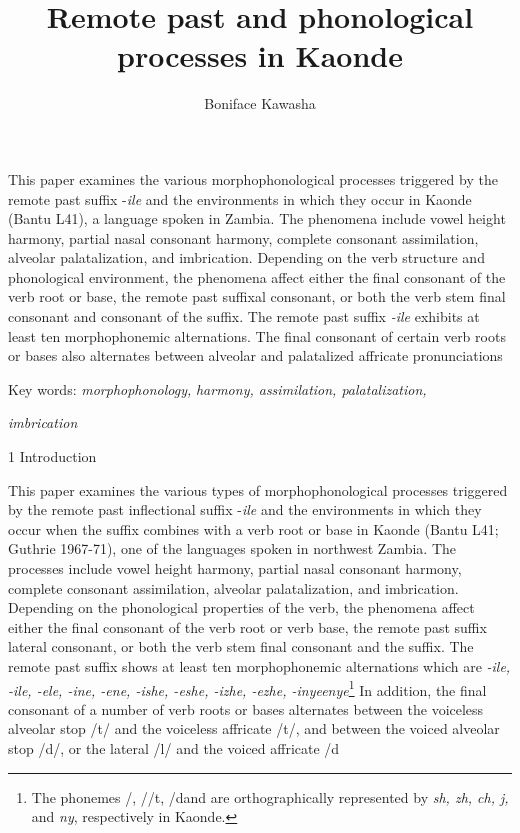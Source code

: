 \documentclass[output=paper]{langsci/langscibook}
\title{Remote past and phonological processes in Kaonde}
\author{%
Boniface Kawasha\affiliation{Savannah State University}
}
\begin{document}
\begin{stylelsAbstract}
This paper examines the various morphophonological processes triggered by the remote past suffix -\emph{ile} and the environments in which they occur in Kaonde (Bantu L41), a language spoken in Zambia. The phenomena include vowel height harmony, partial nasal consonant harmony, complete consonant assimilation, alveolar palatalization, and imbrication. Depending on the verb structure and phonological environment, the phenomena affect either the final consonant of the verb root or base, the remote past suffixal consonant, or both the verb stem final consonant and consonant of the suffix. The remote past suffix \emph{{}-ile} exhibits at least ten morphophonemic alternations. The final consonant of certain verb roots or bases also alternates between alveolar and palatalized affricate pronunciations 
\end{stylelsAbstract}

Key words: \textit{morphophonology,} \emph{harmony, assimilation, palatalization, }

\emph{                   imbrication}

\begin{stylelsSectioni}
1 Introduction
\end{stylelsSectioni}

This paper examines the various types of morphophonological processes triggered by the remote past inflectional suffix -\emph{ile} and the environments in which they occur when the suffix combines with a verb root or base in Kaonde (Bantu L41; Guthrie 1967-71), one of the languages spoken in northwest Zambia. The processes include vowel height harmony, partial nasal consonant harmony, complete consonant assimilation, alveolar palatalization, and imbrication. Depending on the phonological properties of the verb, the phenomena affect either the final consonant of the verb root or verb base, the remote past suffix lateral consonant, or both the verb stem final consonant and the suffix. The remote past suffix shows at least ten morphophonemic alternations which are \emph{{}-ile, -ile, -ele, -ine, -ene, -ishe, -eshe, -izhe, -ezhe, -inye}\emph{enye}\footnote{ The phonemes /, //t, /d\textstyleipa{ }and \textstyleipa{/}\href{http://en.wikipedia.org/wiki/Ɲ}{}\textstyleipa{/}\textstyleipa{ }are orthographically represented by \textit{sh, zh, ch, j,} and \textit{ny}, respectively in Kaonde.} In addition, the final consonant of a number of verb roots or bases alternates between the voiceless alveolar stop /t/ and the voiceless affricate /t/, and between the voiced alveolar stop /d/, or the lateral /l/ and the voiced affricate /d
\end{document}
